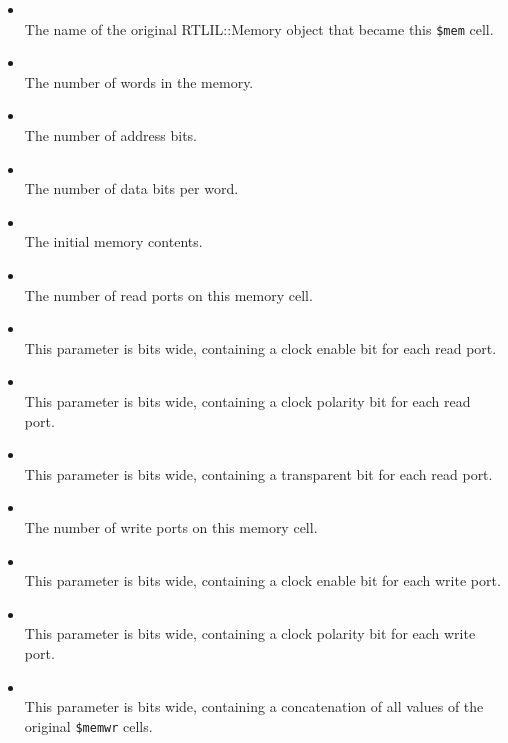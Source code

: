 \begin{itemize}
\item {} \\
The name of the original RTLIL::Memory object that became this {\tt \$mem} cell.

\item {} \\
The number of words in the memory.

\item {} \\
The number of address bits.

\item {} \\
The number of data bits per word.

\item {} \\
The initial memory contents.

\item {} \\
The number of read ports on this memory cell.

\item {} \\
This parameter is  bits wide, containing a clock enable bit for each read port.

\item {} \\
This parameter is  bits wide, containing a clock polarity bit for each read port.

\item {} \\
This parameter is  bits wide, containing a transparent bit for each read port.

\item {} \\
The number of write ports on this memory cell.

\item {} \\
This parameter is  bits wide, containing a clock enable bit for each write port.

\item {} \\
This parameter is  bits wide, containing a clock polarity bit for each write port.

\item {} \\
This parameter is  bits wide, containing a concatenation of all
 values of the original {\tt \$memwr} cells.
\end{itemize}


